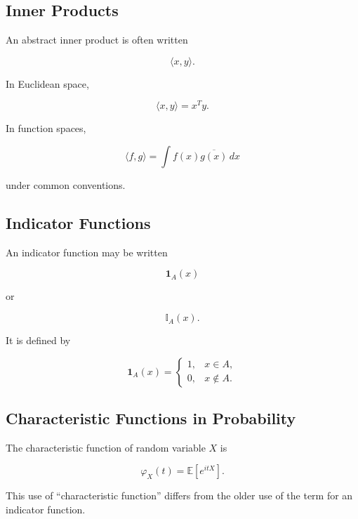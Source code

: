 \subsection{Inner Products}
\label{subsec:inner-product-reference}

An abstract inner product is often written

\[
\boxed{
\langle x,y\rangle.
}
\]

In Euclidean space,

\[
\boxed{
\langle x,y\rangle
=
x^Ty.
}
\]

In function spaces,

\[
\boxed{
\langle f,g\rangle
=
\int
f(x)\overline{g(x)}\,dx
}
\]

under common conventions.

\subsection{Indicator Functions}
\label{subsec:indicator-function-reference}

An indicator function may be written

\[
\boxed{
\mathbf{1}_A(x)
}
\]

or

\[
\boxed{
\mathbb{I}_A(x).
}
\]

It is defined by

\[
\boxed{
\mathbf{1}_A(x)
=
\begin{cases}
1, & x\in A,\\
0, & x\notin A.
\end{cases}
}
\]

\subsection{Characteristic Functions in Probability}
\label{subsec:probability-characteristic-function-reference}

The characteristic function of random variable \(X\) is

\[
\boxed{
\varphi_X(t)
=
\mathbb{E}[e^{itX}].
}
\]

This use of ``characteristic function'' differs from the older use of the
term for an indicator function.

